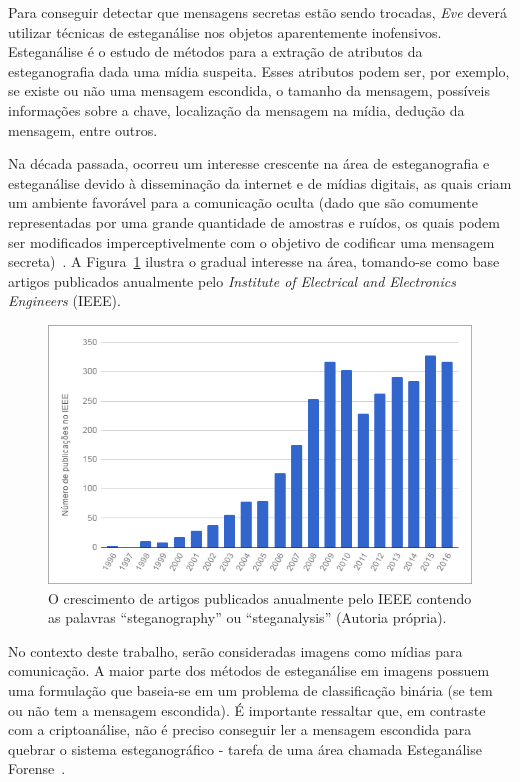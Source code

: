 Para conseguir detectar que mensagens secretas estão sendo trocadas, \textit{Eve} deverá utilizar técnicas de esteganálise nos objetos aparentemente inofensivos. Esteganálise é o estudo de métodos para a extração de atributos da esteganografia dada uma mídia suspeita. Esses atributos podem ser, por exemplo, se existe ou não uma mensagem escondida, o tamanho da mensagem, possíveis informações sobre a chave, localização da mensagem na mídia, dedução da mensagem, entre outros.%

Na década passada, ocorreu um interesse crescente na área de esteganografia e esteganálise devido à disseminação da internet e de mídias digitais, as quais criam um ambiente favorável para a comunicação oculta (dado que são comumente representadas por uma grande quantidade de amostras e ruídos, os quais podem ser modificados imperceptivelmente com o objetivo de codificar uma mensagem secreta)~\cite{fridrich2009steganography}. A Figura~\ref{fig:ieee-steganography} ilustra o gradual interesse na área, tomando-se como base artigos publicados anualmente pelo \textit{Institute of Electrical and Electronics Engineers} (IEEE).

\begin{figure}[h]
	\centering
	\includegraphics[width=\textwidth]{dados/figuras/steg_graph.png}
	\caption{O crescimento de artigos publicados anualmente pelo IEEE contendo as palavras ``steganography'' ou ``steganalysis'' (Autoria própria).}
	\label{fig:ieee-steganography}
\end{figure}

No contexto deste trabalho, serão consideradas imagens como mídias para comunicação. A maior parte dos métodos de esteganálise em imagens possuem uma formulação que baseia-se em um problema de classificação binária (se tem ou não tem a mensagem escondida). É importante ressaltar que, em contraste com a criptoanálise, não é preciso conseguir ler a mensagem escondida para quebrar o sistema esteganográfico - tarefa de uma área chamada Esteganálise Forense~\cite{fridrich2009steganography}. 


